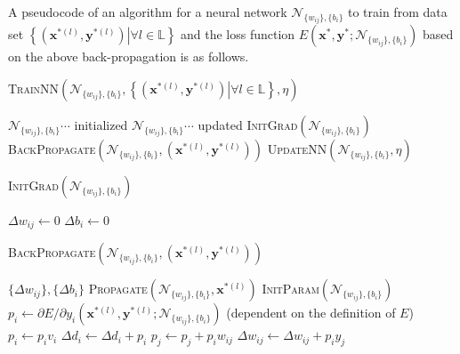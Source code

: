 \documentclass{article}
\begin{document}
A pseudocode of an algorithm for a neural network $\mathcal{N}_{\{w_{ij}\},\{b_{i}\}}$
to train from data set $\left\{\left.(\bm{x}^{*(l)},\bm{y}^{*(l)})\right|\forall l\in\mathbb{L}\right\}$
and the loss function $E(\bm{x}^{*},\bm{y}^{*};\mathcal{N}_{\{w_{ij}\},\{b_{i}\}})$
based on the above back-propagation is as follows.
\begin{algorithm}
\caption{\textsc{TrainNN}$(\mathcal{N}_{\{w_{ij}\},\{b_{i}\}},\left\{\left.(\bm{x}^{*(l)},\bm{y}^{*(l)})\right|\forall l\in\mathbb{L}\right\},\eta)$}
\begin{algorithmic}[1]
\Require $\mathcal{N}_{\{w_{ij}\},\{b_{i}\}} \cdots$ initialized
\Ensure $\mathcal{N}_{\{w_{ij}\},\{b_{i}\}} \cdots$ updated
\State \textsc{InitGrad}$(\mathcal{N}_{\{w_{ij}\},\{b_{i}\}})$ 
 
  \State \textsc{BackPropagate}$(\mathcal{N}_{\{w_{ij}\},\{b_{i}\}},(\bm{x}^{*(l)},\bm{y}^{*(l)}))$
\EndFor
\State \textsc{UpdateNN}$(\mathcal{N}_{\{w_{ij}\},\{b_{i}\}},\eta)$ 
\end{algorithmic}
\end{algorithm}

\begin{algorithm}
\caption{\textsc{InitGrad}$(\mathcal{N}_{\{w_{ij}\},\{b_{i}\}})$}
\begin{algorithmic}[1]
    \State $\varDelta w_{ij}\leftarrow 0$
  \EndFor
  \State $\varDelta b_{i}\leftarrow 0$
\EndFor
\end{algorithmic}
\end{algorithm}

\begin{algorithm}
\caption{\textsc{BackPropagate}$(\mathcal{N}_{\{w_{ij}\},\{b_{i}\}},(\bm{x}^{*(l)},\bm{y}^{*(l)}))$}
\begin{algorithmic}[1]
\Ensure $\{\varDelta w_{ij}\},\{\varDelta b_{i}\}$
\State \textsc{Propagate}$(\mathcal{N}_{\{w_{ij}\},\{b_{i}\}},\bm{x}^{*(l)})$
\State \textsc{InitParam}$(\mathcal{N}_{\{w_{ij}\},\{b_{i}\}})$
 
  \State $p_{i}\leftarrow {\partial E}/{\partial y_{i}}(\bm{x}^{*(l)},\bm{y}^{*(l)};\mathcal{N}_{\{w_{ij}\},\{b_{i}\}})$ (dependent on the definition of $E$)
\EndFor
{} 
    \State $p_{i}\leftarrow p_{i}v_{i}$
    \State $\varDelta d_{i}\leftarrow\varDelta d_{i}+p_{i}$
      \State $p_{j}\leftarrow p_{j}+p_{i}w_{ij}$
      \State $\varDelta w_{ij}\leftarrow\varDelta w_{ij}+p_{i}y_{j}$
    \EndFor
  \EndFor
\EndFor
\end{algorithmic}
\end{algorithm}
\end{document}
